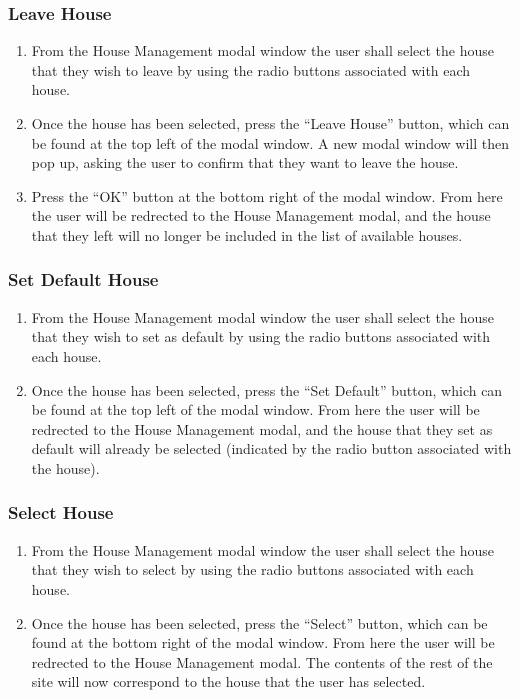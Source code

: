 \documentclass[12pt]{article}
\begin{document}
\subsubsection{Leave House}
\begin{enumerate}
\item From the House Management modal window the user shall select the house that they wish to leave by using the radio buttons associated with each house.
\item Once the house has been selected, press the ``Leave House'' button, which can be found at the top left of the modal window. A new modal window will then pop up, asking the user to confirm that they want to leave the house.
\item Press the ``OK'' button at the bottom right of the modal window. From here the user will be redrected to the House Management modal, and the house that they left will no longer be included in the list of available houses.
\end{enumerate}
  
\subsubsection{Set Default House}
\begin{enumerate}
\item From the House Management modal window the user shall select the house that they wish to set as default by using the radio buttons associated with each house.
\item Once the house has been selected, press the ``Set Default'' button, which can be found at the top left of the modal window. From here the user will be redrected to the House Management modal, and the house that they set as default will already be selected (indicated by the radio button associated with the house).
\end{enumerate}

\subsubsection{Select House}
\begin{enumerate}
\item From the House Management modal window the user shall select the house that they wish to select by using the radio buttons associated with each house.
\item Once the house has been selected, press the ``Select'' button, which can be found at the bottom right of the modal window. From here the user will be redrected to the House Management modal. The contents of the rest of the site will now correspond to the house that the user has selected.
\end{enumerate}
  
\end{document}
